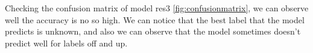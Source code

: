 Checking the confusion matrix of model res3 \ref{fig:confusionmatrix}, we can observe well the accuracy is no so high. We can notice that the best label that the model predicts is unknown, and also we can observe that the model sometimes doesn't predict well for labels off and up.  

%
%
%
